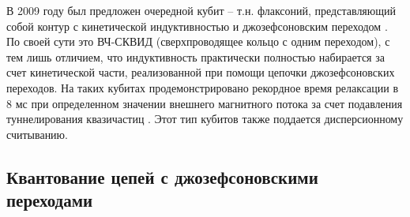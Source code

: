 \documentclass[14pt, a4paper]{extreport}
\numberwithin{equation}{section}
\begin{document}
В 2009 году был предложен очередной кубит -- т.н. флаксоний, представляющий собой контур с кинетической индуктивностью и джозефсоновским переходом \cite{manucharyan2009fluxonium}. По своей сути это ВЧ-СКВИД (сверхпроводящее кольцо с одним переходом), с тем лишь отличием, что индуктивность практически полностью набирается за счет кинетической части, реализованной при помощи цепочки джозефсоновских переходов. На таких кубитах продемонстрировано рекордное время релаксации в 8 мс при определенном значении внешнего магнитного потока за счет подавления туннелирования квазичастиц \cite{catelani2011relaxation, pop2014coherent}. Этот тип кубитов также поддается дисперсионному считыванию.

\subsection{Квантование цепей с джозефсоновскими переходами}
\end{document}
